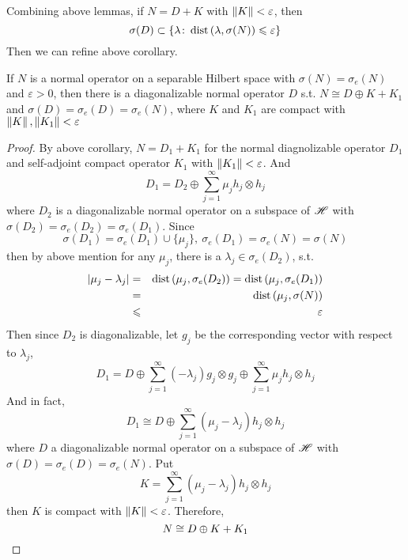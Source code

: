 Combining above lemmas, if $N = D + K$ with $\left\lVert K\right\lVert < \varepsilon$, then 
\begin{equation*}
	\sigma(D) \subset \{ \lambda \colon \operatorname{dist}{(\lambda,\sigma(N))} \leqslant \varepsilon\}
\end{equation*}
Then we can refine above corollary.

\begin{prop}
	If $N$ is a normal operator on a separable Hilbert space with $\sigma(N) = \sigma_e(N)$ and $\varepsilon > 0$, then there is a diagonalizable normal operator $D$ s.t. $N \cong D \oplus K + K_1 $ and $\sigma(D) = \sigma_e(D) = \sigma_e(N)$, where $K$ and $K_1$ are compact with $\left\lVert K\right\lVert, \left\lVert K_1\right\lVert < \varepsilon$
\end{prop}
\begin{proof}
	By above corollary, $N = D_1 + K_1$ for the normal diagnolizable operator $D_1$ and self-adjoint compact operator $K_1$ with $\left\lVert K_1\right\lVert < \varepsilon$. And
	\begin{equation*}
		D_1 = D_2 \oplus \sum_{j=1}^{\infty} \mu_j h_j \otimes h_j
	\end{equation*}
	where $D_2$ is a diagonalizable normal operator on a subspace of $\mathscr{H}$ with $\sigma(D_2) = \sigma_e(D_2) = \sigma_e(D_1)$. Since 
	\begin{equation*}
		\sigma(D_1) = \sigma_e(D_1) \cup \{\mu_j\},~ \sigma_e(D_1) = \sigma_e(N) = \sigma(N)
	\end{equation*}
	then by above mention for any $\mu_j$, there is a $\lambda_j \in \sigma_e(D_2)$, s.t.
	\begin{eqnarray*}
		\left\lvert\mu_j - \lambda_j\right\lvert &=& \operatorname{dist}{(\mu_j, \sigma_e(D_2))} = \operatorname{dist}{(\mu_j, \sigma_e(D_1))} \\
		&=& \operatorname{dist}{(\mu_j, \sigma(N))} \\
		&\leqslant& \varepsilon
	\end{eqnarray*}
	Then since $D_2$ is diagonalizable, let $g_j$ be the corresponding vector  with respect to $\lambda_j$,
	\begin{equation*}
		D_1 = D \oplus \sum_{j=1}^{\infty} (-\lambda_j) g_j \otimes g_j \oplus \sum_{j=1}^{\infty} \mu_j h_j \otimes h_j
	\end{equation*}
	And in fact,
	\begin{equation*}
		D_1 \cong D \oplus \sum_{j=1}^{\infty} (\mu_j-\lambda_j) h_j \otimes h_j
	\end{equation*}
	where $D$ a diagonalizable normal operator on a subspace of $\mathscr{H}$ with $\sigma(D) = \sigma_e(D) = \sigma_e(N)$. Put 
	\begin{equation*}
		K = \sum_{j=1}^{\infty} (\mu_j-\lambda_j) h_j \otimes h_j
	\end{equation*}
	then $K$ is compact with $\left\lVert K\right\lVert < \varepsilon$. Therefore,
	\begin{equation*}
		N \cong D \oplus K + K_1 \qedhere
	\end{equation*}	
\end{proof}

